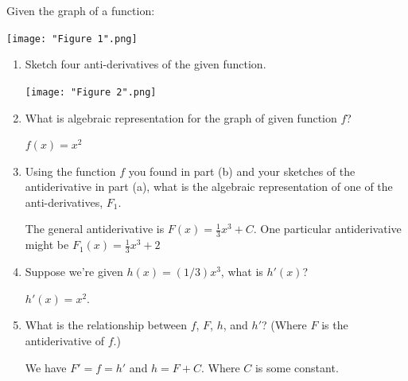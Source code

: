 \documentclass[nooutcomes,handout]{ximera}
\begin{document}
	
	
	


\begin{problem}
  Given the graph of a function:
  \begin{image}
    \texttt{[image: "Figure 1".png]}
  \end{image}
  
  \begin{enumerate}
    \item
      Sketch four anti-derivatives of the given function.
      \begin{freeResponse} \hfil
        \begin{image}
          \texttt{[image: "Figure 2".png]}
        \end{image}
      \end{freeResponse}


    \item
      What is algebraic representation for the graph of given function $f$?
      \begin{freeResponse}
        $f(x) = x^2$
      \end{freeResponse}


    \item
      Using the function $f$ you found in part (b) and your sketches of the antiderivative in part (a), what is the algebraic representation of one of the anti-derivatives, $F_1$.
      \begin{freeResponse}
       The general antiderivative is $F(x) = \frac{1}{3}x^3+C$.  One particular antiderivative might be $F_1(x) = \frac{1}{3}x^3+2$
      \end{freeResponse}

    \item
      Suppose we're given $h(x) = (1/3)x^3$, what is $h'(x)$?
      \begin{freeResponse}
        $h'(x) = x^2$.
      \end{freeResponse}


    \item
      What is the relationship between $f$, $F$, $h$, and $h'$?  (Where $F$ is the antiderivative of $f$.)
      \begin{freeResponse}
        We have $F' = f = h'$ and $h = F+C$. Where $C$ is some constant.
      \end{freeResponse}
  \end{enumerate}
\end{problem}
\end{document}
